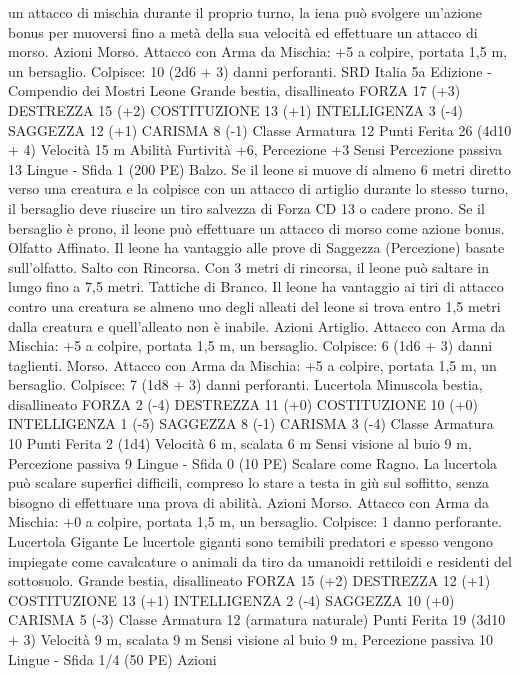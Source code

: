\begin{multicols}{2}
un attacco di mischia durante il proprio turno, la iena può
svolgere un’azione bonus per muoversi fino a metà della sua
velocità ed effettuare un attacco di morso.
Azioni
Morso. Attacco con Arma da Mischia: +5 a colpire, portata 1,5
m, un bersaglio.
Colpisce: 10 (2d6 + 3) danni perforanti.
SRD Italia 5a Edizione - Compendio dei Mostri
Leone
Grande bestia, disallineato
FORZA 17 (+3)
DESTREZZA 15 (+2)
COSTITUZIONE 13 (+1)
INTELLIGENZA 3 (-4)
SAGGEZZA 12 (+1)
CARISMA 8 (-1)
Classe Armatura 12
Punti Ferita 26 (4d10 + 4)
Velocità 15 m
Abilità Furtività +6, Percezione +3
Sensi Percezione passiva 13
Lingue -
Sfida 1 (200 PE)
Balzo. Se il leone si muove di almeno 6 metri diretto verso una
creatura e la colpisce con un attacco di artiglio durante lo stesso
turno, il bersaglio deve riuscire un tiro salvezza di Forza CD 13 o
cadere prono. Se il bersaglio è prono, il leone può effettuare un
attacco di morso come azione bonus.
Olfatto Affinato. Il leone ha vantaggio alle prove di Saggezza
(Percezione) basate sull’olfatto.
Salto con Rincorsa. Con 3 metri di rincorsa, il leone può saltare
in lungo fino a 7,5 metri.
Tattiche di Branco. Il leone ha vantaggio ai tiri di attacco contro
una creatura se almeno uno degli alleati del leone si trova entro
1,5 metri dalla creatura e quell’alleato non è inabile.
Azioni
Artiglio. Attacco con Arma da Mischia: +5 a colpire, portata 1,5
m, un bersaglio.
Colpisce: 6 (1d6 + 3) danni taglienti.
Morso. Attacco con Arma da Mischia: +5 a colpire, portata 1,5
m, un bersaglio.
Colpisce: 7 (1d8 + 3) danni perforanti.
Lucertola
Minuscola bestia, disallineato
FORZA 2 (-4)
DESTREZZA 11 (+0)
COSTITUZIONE 10 (+0)
INTELLIGENZA 1 (-5)
SAGGEZZA 8 (-1)
CARISMA 3 (-4)
Classe Armatura 10
Punti Ferita 2 (1d4)
Velocità 6 m, scalata 6 m
Sensi visione al buio 9 m, Percezione passiva 9
Lingue -
Sfida 0 (10 PE)
Scalare come Ragno. La lucertola può scalare superfici difficili,
compreso lo stare a testa in giù sul soffitto, senza bisogno di
effettuare una prova di abilità.
Azioni
Morso. Attacco con Arma da Mischia: +0 a colpire, portata 1,5
m, un bersaglio.
Colpisce: 1 danno perforante.
Lucertola Gigante
Le lucertole giganti sono temibili predatori e spesso
vengono impiegate come cavalcature o animali da tiro
da umanoidi rettiloidi e residenti del sottosuolo.
Grande bestia, disallineato
FORZA 15 (+2)
DESTREZZA 12 (+1)
COSTITUZIONE 13 (+1)
INTELLIGENZA 2 (-4)
SAGGEZZA 10 (+0)
CARISMA 5 (-3)
Classe Armatura 12 (armatura naturale)
Punti Ferita 19 (3d10 + 3)
Velocità 9 m, scalata 9 m
Sensi visione al buio 9 m, Percezione passiva 10
Lingue -
Sfida 1/4 (50 PE)
Azioni

\end{multicols}
